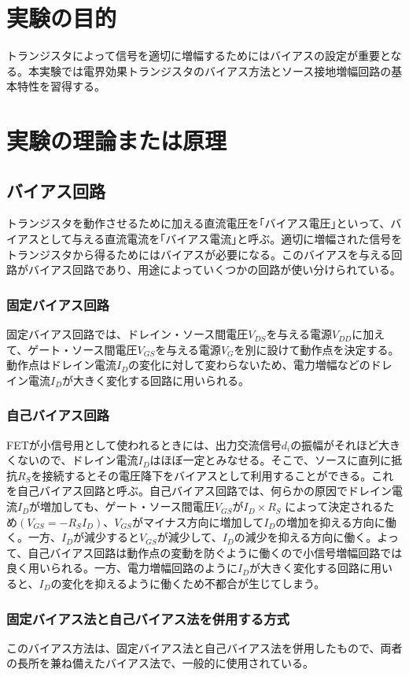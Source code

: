 \documentclass[a4paper,11pt,xelatex,ja=standard]{bxjsarticle}
\begin{document}
\section{実験の目的}

    トランジスタによって信号を適切に増幅するためにはバイアスの設定が重要となる。本実験では電界効果トランジスタのバイアス方法とソース接地増幅回路の基本特性を習得する。

\section{実験の理論または原理}
    \subsection{バイアス回路}
        トランジスタを動作させるために加える直流電圧を｢バイアス電圧｣といって、バイアスとして与える直流電流を｢バイアス電流｣と呼ぶ。適切に増幅された信号をトランジスタから得るためにはバイアスが必要になる。このバイアスを与える回路がバイアス回路であり、用途によっていくつかの回路が使い分けられている。
        \subsubsection{固定バイアス回路}
            固定バイアス回路では、ドレイン・ソース間電圧$V_{DS}$を与える電源$V_{DD}$に加えて、ゲート・ソース間電圧$V_{GS}$を与える電源$V_G$を別に設けて動作点を決定する。動作点はドレイン電流$I_D$の変化に対して変わらないため、電力増幅などのドレイン電流$I_D$が大きく変化する回路に用いられる。
        \subsubsection{自己バイアス回路}
            FETが小信号用として使われるときには、出力交流信号$d_i$の振幅がそれほど大きくないので、ドレイン電流$I_D$はほぼ一定とみなせる。そこで、ソースに直列に抵抗$R_S$を接続するとその電圧降下をバイアスとして利用することができる。これを自己バイアス回路と呼ぶ。自己バイアス回路では、何らかの原因でドレイン電流$I_D$が増加しても、ゲート・ソース間電圧$V_{GS}$が$I_D \times R_S$ によって決定されるため$(V_{GS} = - R_S I_D)$、$V_{GS}$がマイナス方向に増加して$I_D$の増加を抑える方向に働く。一方、$I_D$が減少すると$V_{GS}$が減少して、$I_D$の減少を抑える方向に働く。よって、自己バイアス回路は動作点の変動を防ぐように働くので小信号増幅回路では良く用いられる。一方、電力増幅回路のように$I_D$が大きく変化する回路に用いると、$I_D$の変化を抑えるように働くため不都合が生じてしまう。
        \subsubsection{固定バイアス法と自己バイアス法を併用する方式}
            このバイアス方法は、固定バイアス法と自己バイアス法を併用したもので、両者の長所を兼ね備えたバイアス法で、一般的に使用されている。
\end{document}
